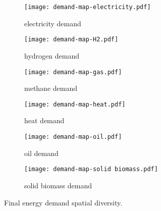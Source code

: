 \begin{figure}
    \centering
    \begin{subfigure}[t]{0.49\textwidth}
        \centering
        \caption{electricity demand}
        \label{fig:demand-space:electricity}
        \texttt{[image: demand-map-electricity.pdf]}
    \end{subfigure}
    \begin{subfigure}[t]{0.49\textwidth}
        \centering
        \caption{hydrogen demand}
        \label{fig:demand-space:hydrogen}
        \texttt{[image: demand-map-H2.pdf]}
    \end{subfigure}
    \begin{subfigure}[t]{0.49\textwidth}
        \centering
        \caption{methane demand}
        \label{fig:demand-space:methane}
        \texttt{[image: demand-map-gas.pdf]}
    \end{subfigure}
    \begin{subfigure}[t]{0.49\textwidth}
        \centering
        \caption{heat demand}
        \label{fig:demand-space:heat}
        \texttt{[image: demand-map-heat.pdf]}
    \end{subfigure}
    \begin{subfigure}[t]{0.49\textwidth}
        \centering
        \caption{oil demand}
        \label{fig:demand-space:oil}
        \texttt{[image: demand-map-oil.pdf]}
    \end{subfigure}
    \begin{subfigure}[t]{0.49\textwidth}
        \centering
        \caption{solid biomass demand}
        \label{fig:demand-space:biomass}
        \texttt{[image: demand-map-solid biomass.pdf]}
    \end{subfigure}
    \caption{Final energy demand spatial diversity.}
    \label{fig:demand-space}
\end{figure}
\restoregeometry
















